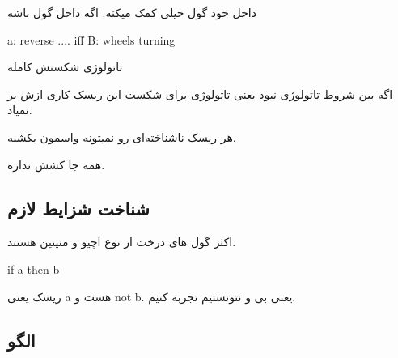 داخل خود گول خیلی کمک میکنه. اگه داخل گول باشه

a: reverse .... iff B: wheels turning

تاتولوژی شکستش کامله

اگه بین شروط تاتولوژی نبود یعنی تاتولوژی برای شکست این ریسک کاری ازش بر نمیاد.

هر ریسک ناشناخته‌ای رو نمیتونه واسمون بکشنه.

همه جا کشش نداره.

\subsection{شناخت شزایط لازم}

اکثر گول ‌های درخت از نوع اچیو و منیتین هستند.

if a then b

ریسک یعنی a هست و not b. یعنی بی و نتونستیم تجربه کنیم.

\subsection{الگو}

